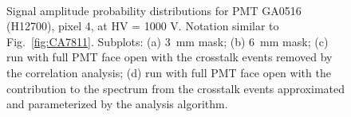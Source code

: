 \begin{figure}[hbt] 
\centering 
   \\
  \caption{Signal amplitude probability distributions for PMT GA0516 (H12700), pixel 4, at HV = 1000 V. Notation similar to Fig.~\ref{fig:CA7811}. Subplots: (a) 3~mm mask; (b) 6~mm mask; (c) run with full PMT face open with the crosstalk events removed by the correlation analysis; (d) run with full PMT face open with the contribution to the spectrum from the crosstalk events approximated and parameterized by the analysis algorithm.
    }
\label{fig:GA0516_1}
\end{figure}
